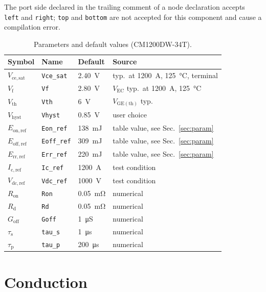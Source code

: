 \documentclass[11pt,a4paper]{article}
\newcommand{\code}[1]{\texttt{\small #1}}
\begin{document}
\noindent
The port side declared in the trailing comment of a node declaration accepts
\code{left} and \code{right}; \code{top} and \code{bottom} are not accepted for
this component and cause a compilation error.

\begin{table}[h]
\centering
\caption{Parameters and default values (CM1200DW-34T).}
\begin{tabular}{llll}
\toprule
Symbol & Name & Default & Source \\
\midrule
$V_\mathrm{ce,sat}$ & \code{Vce\_sat} & \SI{2.40}{\volt} &
  typ.\ at \SI{1200}{\ampere}, \SI{125}{\degreeCelsius}, terminal \\
$V_\mathrm{f}$ & \code{Vf} & \SI{2.80}{\volt} &
  $V_\mathrm{EC}$ typ.\ at \SI{1200}{\ampere}, \SI{125}{\degreeCelsius} \\
$V_\mathrm{th}$ & \code{Vth} & \SI{6}{\volt} & $V_\mathrm{GE(th)}$ typ. \\
$V_\mathrm{hyst}$ & \code{Vhyst} & \SI{0.85}{\volt} & user choice \\
$E_\mathrm{on,ref}$ & \code{Eon\_ref} & \SI{138}{\milli\joule} &
  table value, see Sec.~\ref{sec:param} \\
$E_\mathrm{off,ref}$ & \code{Eoff\_ref} & \SI{309}{\milli\joule} &
  table value, see Sec.~\ref{sec:param} \\
$E_\mathrm{rr,ref}$ & \code{Err\_ref} & \SI{220}{\milli\joule} &
  table value, see Sec.~\ref{sec:param} \\
$I_\mathrm{c,ref}$ & \code{Ic\_ref} & \SI{1200}{\ampere} & test condition \\
$V_\mathrm{dc,ref}$ & \code{Vdc\_ref} & \SI{1000}{\volt} & test condition \\
$R_\mathrm{on}$ & \code{Ron} & \SI{0.05}{\milli\ohm} & numerical \\
$R_\mathrm{d}$ & \code{Rd} & \SI{0.05}{\milli\ohm} & numerical \\
$G_\mathrm{off}$ & \code{Goff} & \SI{1}{\micro\siemens} & numerical \\
$\tau_\mathrm{s}$ & \code{tau\_s} & \SI{1}{\micro\second} & numerical \\
$\tau_\mathrm{p}$ & \code{tau\_p} & \SI{200}{\micro\second} & numerical \\
\bottomrule
\end{tabular}
\end{table}

\section{Conduction}
\end{document}
